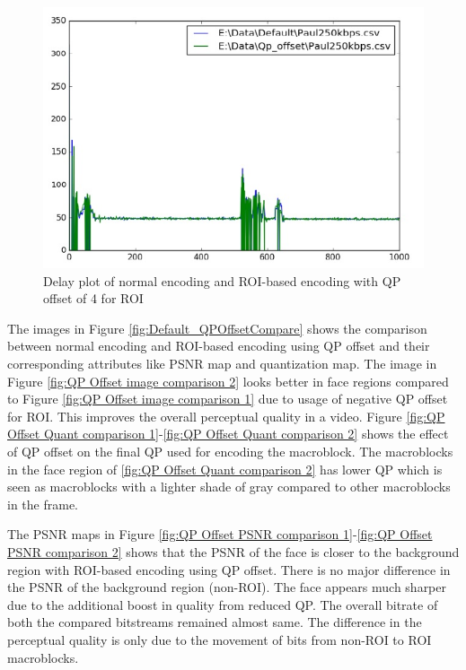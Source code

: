 \documentclass[11pt]{article} %
\begin{document}
\begin{figure}[!h]
    \centering
    \includegraphics[scale=0.75]{QPOffset/Paul250kbps_QP_Offset_Delay}
    \caption{Delay plot of normal encoding and ROI-based encoding with QP offset of 4 for ROI}
    \label{fig:DelayDefault_QPOffsetCompare}
\end{figure}

The images in Figure \ref{fig:Default_QPOffsetCompare} shows the comparison between normal encoding and ROI-based encoding using QP offset and their corresponding attributes like PSNR map and  quantization map. The image in Figure \ref{fig:QP Offset image comparison 2} looks better in face regions compared to Figure \ref{fig:QP Offset image comparison 1} due to usage of negative QP offset for ROI. This improves the overall perceptual quality in a video. Figure \ref{fig:QP Offset Quant comparison 1}-\ref{fig:QP Offset Quant comparison 2} shows the effect of QP offset on the final QP used for encoding the macroblock. The macroblocks in the face region of \ref{fig:QP Offset Quant comparison 2} has lower QP which is seen as  macroblocks with a lighter shade of gray compared to other macroblocks in the frame. 

 The PSNR maps in Figure \ref{fig:QP Offset PSNR comparison 1}-\ref{fig:QP Offset PSNR comparison 2} shows that the PSNR of the face is closer to the background region with ROI-based encoding using QP offset. There is no major difference in the PSNR of the background region (non-ROI). The face appears much sharper due to the additional boost in quality from reduced QP. The overall bitrate of both the compared bitstreams remained almost same. The difference in the perceptual quality is only due to the movement of bits from non-ROI to ROI macroblocks. 
 
\end{document}
